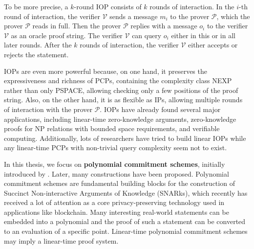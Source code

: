 To be more precise, a $k$-round IOP consists of $k$ rounds of interaction. In the $i$-th round of interaction, the verifier $\mathcal{V}$ sends a message $m_i$ to the prover $\mathcal{P}$, which the prover $\mathcal{P}$ reads in full. 
Then the prover $\mathcal{P}$ replies with a message $o_i$ to the verifier $\mathcal{V}$ as an oracle proof string.
The verifier $\mathcal{V}$ can query $o_i$ either in this or in all later rounds. 
After the $k$ rounds of interaction, the verifier $\mathcal{V}$ either accepts or rejects the statement.


IOPs are even more powerful because, on one hand, it preserves the expressiveness and richness of PCPs, containing the complexity class NEXP rather than only PSPACE, allowing checking only a few positions of the proof string. Also, on the other hand, it is as flexible as IPs, allowing multiple rounds of interaction with the prover $\mathcal{P}$. IOPs have already found several major applications, including linear-time zero-knowledge arguments, zero-knowledge proofs for NP relations with bounded space requirements, and verifiable computing.
Additionally, lots of researchers have tried to build linear IOPs while any linear-time PCPs with non-trivial query complexity seem not to exist.


In this thesis, we focus on \textbf{polynomial commitment schemes}, 
initially introduced by \cite{DBLP:conf/asiacrypt/KateZG10}.
Later, many constructions 
\cite{DBLP:conf/sp/TomescuCZAPGD20} 
\cite{DBLP:journals/iacr/YurekLFKM21} 
\cite{277222}
have been proposed.
Polynomial commitment schemes are fundamental building blocks for the construction of Succinct Non-interactive Arguments of Knowledge (SNARks), 
which recently has received a lot of attention as a core privacy-preserving technology used in applications like blockchain. Many interesting real-world statements can be embedded into a polynomial and the proof of such a statement can be converted to an evaluation of a specific point. Linear-time polynomial commitment schemes may imply a linear-time proof system.

